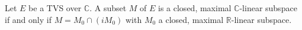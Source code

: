 Let $E$ be a TVS over $\mathbb{C}$. A subset $M$ of $E$ is a closed, maximal $\mathbb{C}$-linear subspace if and only if $M = M_0 \cap (iM_0)$ with $M_0$ a closed, maximal $\mathbb{R}$-linear subspace.